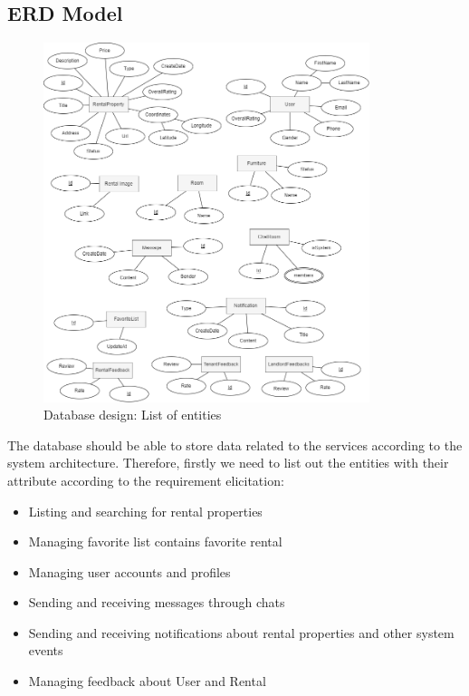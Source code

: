 \subsection{ERD Model}
\begin{figure}[H]
    \centering
    \includegraphics[width=0.85\textwidth]{Images/ERD.png}
    \caption{Database design: List of entities}
    \label{fig:DB-list-entities}
\end{figure}
The database should be able to store data related to the services according to the system architecture. Therefore, firstly we need to list out the entities with their attribute according to the requirement elicitation:
\begin{itemize}
    \item Listing and searching for rental properties
    \item Managing favorite list contains favorite rental
    \item Managing user accounts and profiles
    \item Sending and receiving messages through chats
    \item Sending and receiving notifications about rental properties and other system events
    \item Managing feedback about User and Rental
\end{itemize}

